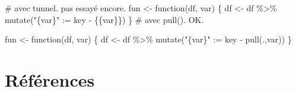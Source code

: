 \documentclass[
  letterpaper,
  DIV=11,
  numbers=noendperiod]{scrreprt}
\newenvironment{Shaded}{\begin{snugshade}}{\end{snugshade}}
\newcommand{\CommentTok}[1]{\textcolor[rgb]{0.37,0.37,0.37}{#1}}
\newcommand{\ControlFlowTok}[1]{\textcolor[rgb]{0.00,0.23,0.31}{#1}}
\newcommand{\ErrorTok}[1]{\textcolor[rgb]{0.68,0.00,0.00}{#1}}
\newcommand{\FunctionTok}[1]{\textcolor[rgb]{0.28,0.35,0.67}{#1}}
\newcommand{\NormalTok}[1]{\textcolor[rgb]{0.00,0.23,0.31}{#1}}
\newcommand{\OtherTok}[1]{\textcolor[rgb]{0.00,0.23,0.31}{#1}}
\newcommand{\SpecialCharTok}[1]{\textcolor[rgb]{0.37,0.37,0.37}{#1}}
\newcommand{\StringTok}[1]{\textcolor[rgb]{0.13,0.47,0.30}{#1}}
\newlength{\cslhangindent}
\newlength{\cslentryspacingunit} %
\newenvironment{CSLReferences}[2] %
 {%
  \setlength{\parindent}{0pt}
  \ifodd #1
  \let\oldpar\par
  \def\par{\hangindent=\cslhangindent\oldpar}
  \fi
  \setlength{\parskip}{#2\cslentryspacingunit}
 }%
 {}
\begin{document}
\begin{Shaded}
\begin{Highlighting}[]
\CommentTok{\# avec tunnel. pas essayé encore.}
\NormalTok{fun }\OtherTok{\textless{}{-}} \ControlFlowTok{function}\NormalTok{(df, var) \{}
\NormalTok{  df }\OtherTok{\textless{}{-}}\NormalTok{ df }\SpecialCharTok{\%\textgreater{}\%} 
    \FunctionTok{mutate}\NormalTok{(}\StringTok{"\{var\}"} \SpecialCharTok{:}\ErrorTok{=}\NormalTok{ key }\SpecialCharTok{{-}}\NormalTok{ \{\{var\}\})}
\NormalTok{\}}
\CommentTok{\# avec pull(). OK.}

\NormalTok{fun }\OtherTok{\textless{}{-}} \ControlFlowTok{function}\NormalTok{(df, var) \{}
\NormalTok{  df }\OtherTok{\textless{}{-}}\NormalTok{ df }\SpecialCharTok{\%\textgreater{}\%} 
    \FunctionTok{mutate}\NormalTok{(}\StringTok{"\{var\}"} \SpecialCharTok{:}\ErrorTok{=}\NormalTok{ key }\SpecialCharTok{{-}} \FunctionTok{pull}\NormalTok{(.,var))}
\NormalTok{\}}
\end{Highlighting}
\end{Shaded}


\hypertarget{ruxe9fuxe9rences}{%
\chapter*{Références}\label{ruxe9fuxe9rences}}


\hypertarget{refs}{}
\begin{CSLReferences}{0}{0}
\end{CSLReferences}
\end{document}
